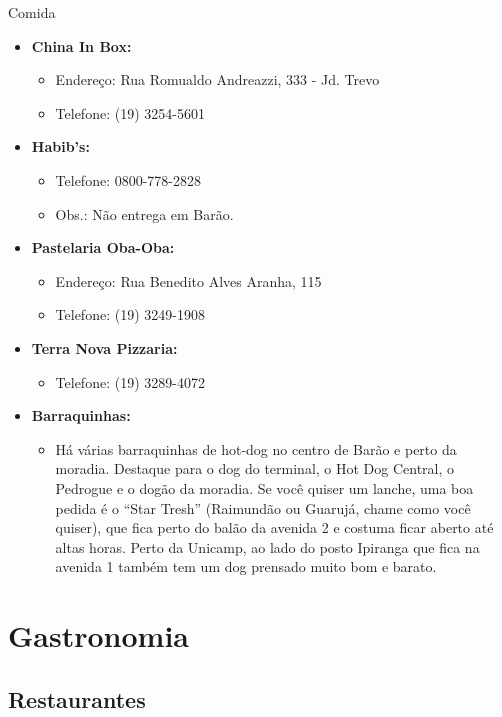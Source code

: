 \begin{story}{Comida}
\begin{itemize}
\item \textbf{China In Box:}
\begin{itemize}
\item Endereço: Rua Romualdo Andreazzi, 333 - Jd. Trevo
\item Telefone: (19) 3254-5601
\end{itemize}

\item \textbf{Habib's:}
\begin{itemize}
\item Telefone: 0800-778-2828
\item Obs.: Não entrega em Barão.
\end{itemize}

\item \textbf{Pastelaria Oba-Oba:}
\begin{itemize}
\item Endereço: Rua Benedito Alves Aranha, 115
\item Telefone: (19) 3249-1908
\end{itemize}

\item \textbf{Terra Nova Pizzaria:}
\begin{itemize}
\item Telefone: (19) 3289-4072
\end{itemize}

\item \textbf{Barraquinhas:}
\begin{itemize}
\item Há várias barraquinhas de hot-dog no centro de Barão e perto da moradia. Destaque para o dog do terminal, o Hot Dog Central, o Pedrogue e o dogão da moradia. Se você quiser um lanche, uma boa pedida é o ``Star Tresh'' (Raimundão ou Guarujá, chame como você quiser), que fica perto do balão da avenida 2 e costuma ficar aberto até altas horas. Perto da Unicamp, ao lado do posto Ipiranga que fica na avenida 1 também tem um dog prensado muito bom e barato.
\end{itemize}

\end{itemize}

\section*{Gastronomia}

\subsection*{Restaurantes}


\end{story}
